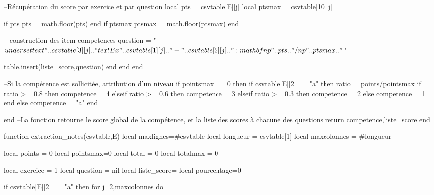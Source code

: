 \documentclass[fiche]{classe-tex3R}
\begin{document}
\begin{luacode*}
                    --Récupération du score par exercice et par question
                    local pts = csvtable[E][j]
                    local ptsmax = csvtable[10][j]
    
                    if pts%
                        pts = math.floor(pts)
                    end
                    if ptsmax%
                        ptsmax = math.floor(ptsmax)
                    end            
    
                    -- construction des item competences
                    question = "$\\underset{\\text{".. csvtable[3][j] .."}}{\\text{Ex " .. csvtable[1][j] .."-" .. csvtable[2][j] .. "}: \\mathbf{\\np{" .. pts .. "}/\\np{" .. ptsmax .. "}}}$"
    
                    table.insert(liste_score,question)
                end
            end
        end
    
    
        --Si la compétence est sollicitée, attribution d'un niveau
        if pointsmax ~= 0 then
            if csvtable[E][2] ~= "a" then
                ratio = points/pointsmax
                if ratio >= 0.8 then
                    competence = 4
                elseif ratio >= 0.6 then
                    competence = 3
                elseif ratio >= 0.3 then
                    competence = 2
                else
                    competence = 1
                end
            else
                competence = "a"
            end
    
    
        end
        --La fonction retourne le score global de la compétence, et la liste des scores à chacune des questions
        return competence,liste_score
    end
    
    function extraction_notes(csvtable,E)
        local maxlignes=#csvtable
        local longueur = csvtable[1]
        local maxcolonnes = #longueur
    
        local points = 0
        local pointsmax=0
        local total = 0
        local totalmax = 0
    
        local exercice = 1
        local question = nil
        local liste_score={}
        local pourcentage=0
    
        if csvtable[E][2] ~= "a" then
            for j=2,maxcolonnes do
            

\end{luacode*}
\end{document}
